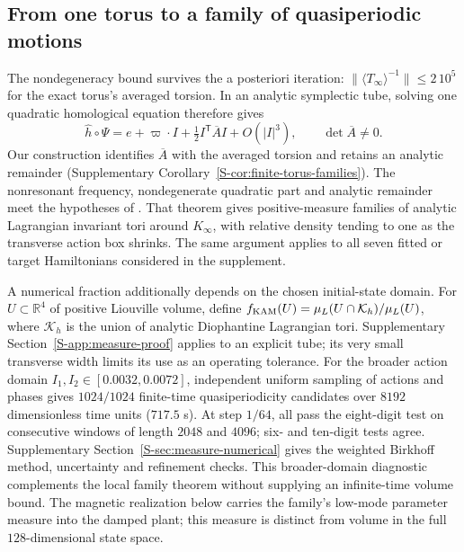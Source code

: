 \subsection{From one torus to a family of quasiperiodic motions}
\label{core-sec-positive-measure}
The nondegeneracy bound survives the a posteriori iteration:
$\|\langle T_\infty\rangle^{-1}\|\leq2\,10^5$ for the exact torus's
averaged torsion. In an analytic symplectic tube, solving one quadratic
homological equation therefore gives
\begin{equation}
 \widehat h\circ\Psi
 =e+\varpi\cdot I+\tfrac12I^{\mathsf T}\overline A I+O(|I|^3),
 \qquad\det\overline A\ne0.
 \label{core-eq-torus-normal-form}
\end{equation}
Our construction identifies $\overline A$ with the averaged torsion and
retains an analytic remainder (Supplementary
Corollary~\ref{S-cor:finite-torus-families}). The nonresonant frequency,
nondegenerate quadratic part and analytic remainder meet the hypotheses
of \citet[Theorem~6, $\alpha=1$, arXiv:1412.0509v1]{bounemoura2016torus}.
That theorem gives positive-measure families of analytic Lagrangian
invariant tori around $K_\infty$, with relative density tending to one
as the transverse action box shrinks. The same argument applies to all
seven fitted or target Hamiltonians considered in the supplement.

A numerical fraction additionally depends on the chosen initial-state
domain. For $U\subset\mathbb R^4$ of positive Liouville volume, define
$f_{\rm KAM}(U)=\mu_L(U\cap\mathcal K_h)/\mu_L(U)$, where
$\mathcal K_h$ is the union of analytic Diophantine Lagrangian tori.
Supplementary Section~\ref{S-app:measure-proof} applies
\citet[Theorems~1 and~3]{chierchia2021measure} to an explicit tube;
its very small transverse width limits its use as an operating tolerance.
For the broader action domain $I_1,I_2\in[0.0032,0.0072]$, independent
uniform sampling of actions and phases gives $1024/1024$ finite-time
quasiperiodicity candidates over $8192$ dimensionless time units
($717.5$ s). At step $1/64$, all pass the eight-digit test on consecutive windows
of length $2048$ and $4096$; six- and ten-digit tests agree.
Supplementary Section~\ref{S-sec:measure-numerical} gives the weighted
Birkhoff method, uncertainty and refinement checks. This broader-domain
diagnostic complements the local family theorem without supplying an
infinite-time volume bound. The magnetic realization below carries the
family's low-mode parameter measure into the damped plant; this measure
is distinct from volume in the full $128$-dimensional state space.
